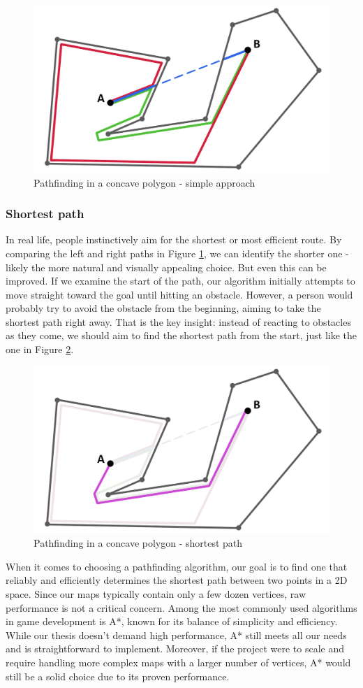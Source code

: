 \begin{figure}[H]
\centering
\includegraphics[width=.65\linewidth]{img/polygon-prototyp.png}
\caption{Pathfinding in a concave polygon - simple approach}
\label{fig:Path-P}
\end{figure}

\subsubsection{Shortest path}
In real life, people instinctively aim for the shortest or most efficient route. By comparing the left and right paths in Figure \ref{fig:Path-P}, we can identify the shorter one - likely the more natural and visually appealing choice. But even this can be improved. If we examine the start of the path, our algorithm initially attempts to move straight toward the goal until hitting an obstacle. However, a person would probably try to avoid the obstacle from the beginning, aiming to take the shortest path right away. That is the key insight: instead of reacting to obstacles as they come, we should aim to find the shortest path from the start, just like the one in Figure \ref{fig:Path-P2}.
 
\begin{figure}[H]
\centering
\includegraphics[width=.65\linewidth]{img/polygon-prototyp2.png}
\caption{Pathfinding in a concave polygon - shortest path}
\label{fig:Path-P2}
\end{figure}

When it comes to choosing a pathfinding algorithm, our goal is to find one that reliably and efficiently determines the shortest path between two points in a 2D space. Since our maps typically contain only a few dozen vertices, raw performance is not a critical concern. Among the most commonly used algorithms in game development is A*, known for its balance of simplicity and efficiency. While our thesis doesn’t demand high performance, A* still meets all our needs and is straightforward to implement. Moreover, if the project were to scale and require handling more complex maps with a larger number of vertices, A* would still be a solid choice due to its proven performance. 

